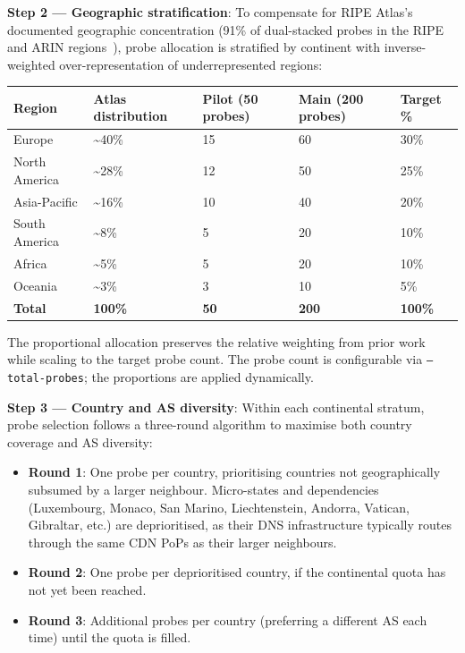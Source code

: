 \textbf{Step 2 --- Geographic stratification}: To compensate for RIPE Atlas's documented geographic concentration (91\% of dual-stacked probes in the RIPE and ARIN regions~\cite{Bajpai2017}), probe allocation is stratified by continent with inverse-weighted over-representation of underrepresented regions:

\begin{table}[H]
\centering
\small
\begin{tabular}{l l l l l}
\toprule
\textbf{Region} & \textbf{Atlas distribution} & \textbf{Pilot (50 probes)} & \textbf{Main (200 probes)} & \textbf{Target \%} \\
\midrule
Europe        & \textasciitilde{}40\% & 15  & 60  & 30\% \\
North America & \textasciitilde{}28\% & 12  & 50  & 25\% \\
Asia-Pacific  & \textasciitilde{}16\% & 10  & 40  & 20\% \\
South America & \textasciitilde{}8\%  &  5  & 20  & 10\% \\
Africa        & \textasciitilde{}5\%  &  5  & 20  & 10\% \\
Oceania       & \textasciitilde{}3\%  &  3  & 10  &  5\% \\
\textbf{Total} & \textbf{100\%} & \textbf{50} & \textbf{200} & \textbf{100\%} \\
\bottomrule
\end{tabular}
\end{table}

The proportional allocation preserves the relative weighting from prior work \cite{Bajpai2017} while scaling to the target probe count. The probe count is configurable via \texttt{--total-probes}; the proportions are applied dynamically.

\textbf{Step 3 --- Country and \ac{AS} diversity}: Within each continental stratum, probe selection follows a three-round algorithm to maximise both country coverage and \ac{AS} diversity:

\begin{itemize}
  \item \textbf{Round 1}: One probe per country, prioritising countries not geographically subsumed by a larger neighbour. Micro-states and dependencies (Luxembourg, Monaco, San Marino, Liechtenstein, Andorra, Vatican, Gibraltar, etc.) are deprioritised, as their \ac{DNS} infrastructure typically routes through the same \ac{CDN} \ac{PoPs} as their larger neighbours.
  \item \textbf{Round 2}: One probe per deprioritised country, if the continental quota has not yet been reached.
  \item \textbf{Round 3}: Additional probes per country (preferring a different \ac{AS} each time) until the quota is filled.
\end{itemize}

